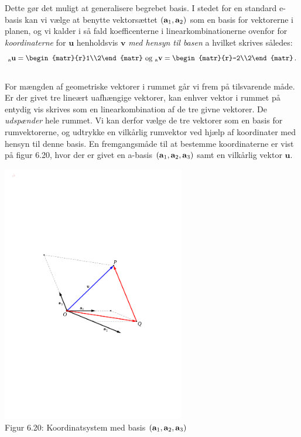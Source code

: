 Dette gør det muligt at generalisere begrebet basis. I stedet for en standard e-basis kan vi vælge at benytte vektorsættet $(\mathbf a_1,\mathbf{a}_2)$ som en basis for  vektorerne i planen, og vi kalder i så fald koefficenterne i linearkombinationerne ovenfor for \textit{koordinaterne} for $\mathbf u$ henholdsvis  $\mathbf v$ \textit{med hensyn til basen} a hvilket skrives således:
\begin{equation}
 _\mathrm a\mathbf u=
\begin{matr}{r}1\\2\end{matr}\,\,\mathrm{og}\,\,
 {_\mathrm a\mathbf v}=
\begin{matr}{r}-2\\2\end{matr}\,.
\end{equation}  
\smallskip\\ 
For mængden af geometriske vektorer i rummet går vi frem på tilsvarende måde. Er der givet tre lineært uafhængige vektorer, kan enhver vektor i rummet på entydig vis skrives som en linearkombination af de tre givne vektorer. De \textit{udspænder} hele rummet. Vi kan derfor vælge de tre vektorer som en basis for rumvektorerne, og udtrykke en vilkårlig rumvektor ved hjælp af koordinater med hensyn til denne basis. En fremgangsmåde til at bestemme koordinaterne er vist på figur 6.20, hvor der er givet en a-basis $(\mathbf a_1,\mathbf a_2,\mathbf{a}_3)$ samt en vilkårlig vektor $\mathbf u$.
\begin{center}
		\includegraphics[trim=3cm 10cm 3cm 10cm,width=0.60\textwidth,clip]{geometer/abasis04.pdf}				
		\\Figur 6.20: Koordinatsystem med basis $(\mathbf{a}_1,\mathbf{a}_2,\mathbf{a}_3)$
\end{center}
